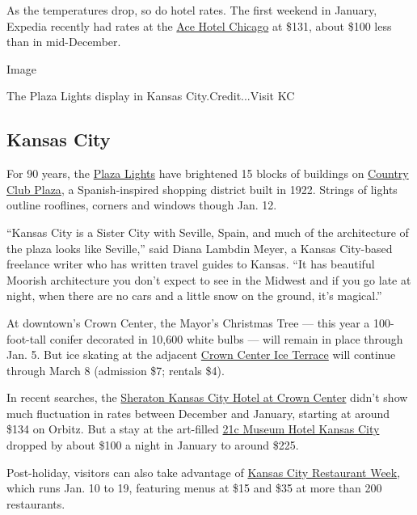 As the temperatures drop, so do hotel rates. The first weekend in
January, Expedia recently had rates at the
\href{https://www.acehotel.com/chicago/}{Ace Hotel Chicago} at \$131,
about \$100 less than in mid-December.

Image

The Plaza Lights display in Kansas City.Credit...Visit KC

\hypertarget{kansas-city}{%
\subsection{Kansas City}\label{kansas-city}}

For 90 years, the
\href{https://www.visitkc.com/visitors/things-do/kansas-city-plaza-lights}{Plaza
Lights} have brightened 15 blocks of buildings on
\href{https://countryclubplaza.com/}{Country Club Plaza}, a
Spanish-inspired shopping district built in 1922. Strings of lights
outline rooflines, corners and windows though Jan. 12.

``Kansas City is a Sister City with Seville, Spain, and much of the
architecture of the plaza looks like Seville,'' said Diana Lambdin
Meyer, a Kansas City-based freelance writer who has written travel
guides to Kansas. ``It has beautiful Moorish architecture you don't
expect to see in the Midwest and if you go late at night, when there are
no cars and a little snow on the ground, it's magical.''

At downtown's Crown Center, the Mayor's Christmas Tree --- this year a
100-foot-tall conifer decorated in 10,600 white bulbs --- will remain in
place through Jan. 5. But ice skating at the adjacent
\href{https://www.crowncenter.com/business/crown-center-ice-terrace}{Crown
Center Ice Terrace} will continue through March 8 (admission \$7;
rentals \$4).

In recent searches, the
\href{https://www.marriott.com/hotels/travel/mcicr-sheraton-kansas-city-hotel-at-crown-center/}{Sheraton
Kansas City Hotel at Crown Center} didn't show much fluctuation in rates
between December and January, starting at around \$134 on Orbitz. But a
stay at the art-filled \href{https://www.21cmuseumhotels.com/}{21c
Museum Hotel Kansas City} dropped by about \$100 a night in January to
around \$225.

Post-holiday, visitors can also take advantage of
\href{http://www.kcrestaurantweek.com/}{Kansas City Restaurant Week},
which runs Jan. 10 to 19, featuring menus at \$15 and \$35 at more than
200 restaurants.

